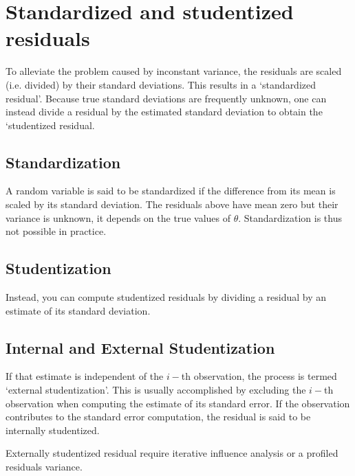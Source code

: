 \documentclass[Main.tex]{subfiles}
\begin{document}
\newpage

\newpage
\section{Standardized and studentized residuals} %

To alleviate the problem caused by inconstant variance, the residuals are scaled (i.e. divided) by their standard deviations. This results in a `standardized residual'. Because true standard deviations are frequently unknown, one can instead divide a residual by the estimated standard deviation to obtain the `studentized residual. 

\subsection{Standardization} %

A random variable is said to be standardized if the difference from its mean is scaled by its standard deviation. The residuals above have mean zero but their variance is unknown, it depends on the true values of $\theta$. Standardization is thus not possible in practice.

\subsection{Studentization} %
Instead, you can compute studentized residuals by dividing a residual by an estimate of its standard deviation. 

\subsection{Internal and External Studentization} %
If that estimate is independent of the $i-$th observation, the process is termed `external studentization'. This is usually accomplished by excluding the $i-$th observation when computing the estimate of its standard error. If the observation contributes to the
standard error computation, the residual is said to be internally studentized.

Externally  studentized residual require iterative influence analysis or a profiled residuals variance.
\end{document}
